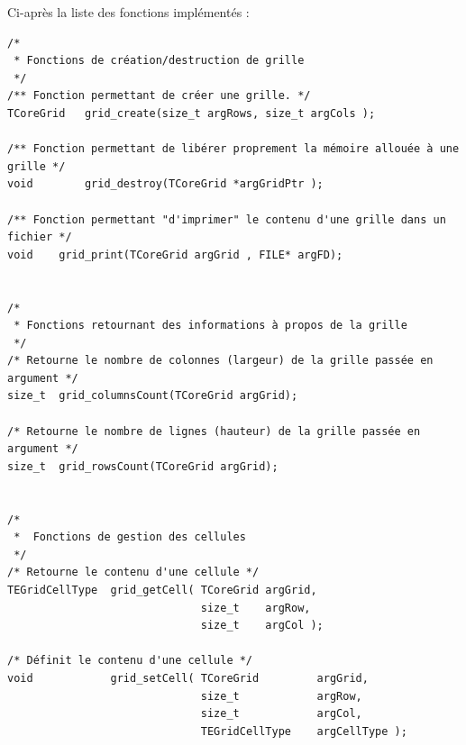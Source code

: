 \documentclass{book}
\begin{document}
Ci-après la liste des fonctions implémentés :
\begin{Verbatim}
/*
 * Fonctions de création/destruction de grille
 */
/** Fonction permettant de créer une grille. */
TCoreGrid   grid_create(size_t argRows, size_t argCols );

/** Fonction permettant de libérer proprement la mémoire allouée à une grille */
void        grid_destroy(TCoreGrid *argGridPtr );

/** Fonction permettant "d'imprimer" le contenu d'une grille dans un fichier */
void    grid_print(TCoreGrid argGrid , FILE* argFD);


/*
 * Fonctions retournant des informations à propos de la grille
 */
/* Retourne le nombre de colonnes (largeur) de la grille passée en argument */
size_t  grid_columnsCount(TCoreGrid argGrid);
 
/* Retourne le nombre de lignes (hauteur) de la grille passée en argument */
size_t  grid_rowsCount(TCoreGrid argGrid);


/*
 *  Fonctions de gestion des cellules
 */
/* Retourne le contenu d'une cellule */
TEGridCellType  grid_getCell( TCoreGrid argGrid,
                              size_t    argRow,
                              size_t    argCol );

/* Définit le contenu d'une cellule */
void            grid_setCell( TCoreGrid         argGrid,
                              size_t            argRow,
                              size_t            argCol,
                              TEGridCellType    argCellType );

\end{Verbatim}





\appendix %


\end{document}
